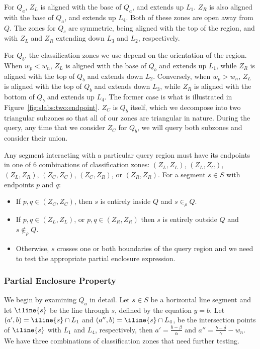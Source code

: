 For $Q_a$, $Z_L$ is aligned with the base of $Q_a$, and extends up $L_1$. 
$Z_R$ is also aligned with the base of $Q_a$, and extends up $L_4$.
Both of these zones are open away from $Q$.
The zones for $Q_c$ are symmetric, being aligned with the top of the region, and with $Z_L$ and $Z_R$ extending down $L_3$ and $L_2$, respectively.

For $Q_b$, the classification zones we use depend on the orientation of the region.
When $w_p < w_n$, $Z_L$ is aligned with the base of $Q_b$ and extends up $L_1$, while $Z_R$ is aligned with the top of $Q_b$ and extends down $L_2$.
Conversely, when $w_p > w_n$, $Z_L$ is aligned with the top of $Q_b$ and extends down $L_3$, while $Z_R$ is aligned with the bottom of $Q_b$ and extends up $L_4$.
The former case is what is illustrated in Figure~\ref{fig:slabs:two:endpoint}.
$Z_C$ is $Q_b$ itself, which we decompose into two triangular subzones so that all of our zones are triangular in nature.
During the query, any time that we consider $Z_C$ for $Q_b$, we will query both subzones and consider their union.

Any segment interacting with a particular query region must have its endpoints in one of 6 combinations of classification zones: $(Z_L, Z_L)$, $(Z_L, Z_C)$, $(Z_L, Z_R)$, $(Z_C,\allowbreak Z_C)$, $(Z_C, Z_R)$, or $(Z_R, Z_R)$. 
For a segment $s \in S$ with endpoints $p$ and $q$:
\begin{itemize}
\item If $p, q \in (Z_C, Z_C)$, then $s$ is entirely inside $Q$ and $s \in_\rho Q$.
\item If $p, q \in (Z_L, Z_L)$, or $p, q \in (Z_R, Z_R)$ then $s$ is entirely outside $Q$ and $s \not \in_\rho Q$.
\item Otherwise, $s$ crosses one or both boundaries of the query region and we need to test the appropriate partial enclosure expression.
\end{itemize}


\subsubsection{Partial Enclosure Property}

We begin by examining $Q_a$ in detail.
Let $s \in S$ be a horizontal line segment and let $\iline{s}$ be the line through $s$, defined by the equation $y = b$.
Let $(a', b) = \iline{s} \cap L_1$ and $(a'', b) = \iline{s} \cap L_4$, be the intersection points of $\iline{s}$ with $L_1$ and $L_4$, respectively, then $a' = \frac{b - \beta}{\alpha}$ and $a'' = \frac{b - \delta}{\gamma} - w_n$.
We have three combinations of classification zones that need further testing.

